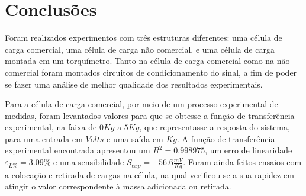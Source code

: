 \documentclass[a4paper]{instrumentacao}
\begin{document}
\chapter{Conclusões}

Foram realizados experimentos com três estruturas diferentes: uma célula de carga comercial, uma célula de carga não comercial, e uma célula de carga montada em um torquímetro. Tanto na célula de carga comercial como na não comercial foram montados circuitos de condicionamento do sinal, a fim de poder se fazer uma análise de melhor qualidade dos resultados experimentais.

Para a célula de carga comercial, por meio de um processo experimental de medidas, foram levantados valores para que se obtesse a função de transferência experimental, na faixa de $0Kg$ a $5Kg$, que representasse a resposta do sistema, para uma entrada em $Volts$ e uma saída em $Kg$. A função de transferência experimental encontrada apresentou um $R^2=0.998975$, um erro de linearidade $\varepsilon_{L\%}=3.09\%$ e uma sensibilidade $S_{exp}=-56.6\frac{mV}{Kg}$. Foram ainda feitos ensaios com a colocação e retirada de cargas na célula, na qual verificou-se a sua rapidez em atingir o valor correspondente à massa adicionada ou retirada.
\end{document}
